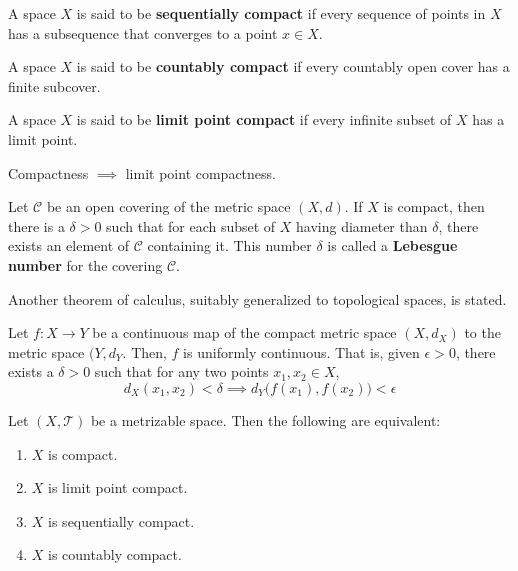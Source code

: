 \documentclass{article}
\begin{document}
    \begin{definition}
    A space $X$ is said to be \textbf{sequentially compact} if every sequence of points in $X$ has a subsequence that converges to a point $x \in X$. 
    \end{definition}

    \begin{definition}
    A space $X$ is said to be \textbf{countably compact} if every countably open cover has a finite subcover. 
    \end{definition}

    \begin{definition}
    A space $X$ is said to be \textbf{limit point compact} if every infinite subset of $X$ has a limit point. 
    \end{definition}

    \begin{theorem}
    Compactness $\implies$ limit point compactness.  
    \end{theorem}

    \begin{lemma}
    Let $\mathscr{C}$ be an open covering of the metric space $(X, d)$. If $X$ is compact, then there is a $\delta > 0$ such that for each subset of $X$ having diameter than $\delta$, there exists an element of $\mathscr{C}$ containing it. This number $\delta$ is called a \textbf{Lebesgue number} for the covering $\mathscr{C}$. 
    \end{lemma}

    Another theorem of calculus, suitably generalized to topological spaces, is stated. 
    \begin{theorem}
    Let $f: X \longrightarrow Y$ be a continuous map of the compact metric space $(X,d_X)$ to the metric space $(Y, d_Y$. Then, $f$ is uniformly continuous. That is, given $\epsilon > 0$, there exists a $\delta > 0$ such that for any two points $x_1, x_2 \in X$, 
    \[d_X (x_1, x_2) < \delta \implies d_Y \big( f(x_1), f(x_2)\big) < \epsilon\]
    \end{theorem}

    \begin{theorem}
    Let $(X, \mathscr{T})$ be a metrizable space. Then the following are equivalent: 
    \begin{enumerate}
        \item $X$ is compact. 
        \item $X$ is limit point compact. 
        \item $X$ is sequentially compact. 
        \item $X$ is countably compact. 
    \end{enumerate}
    \end{theorem}
\end{document}
